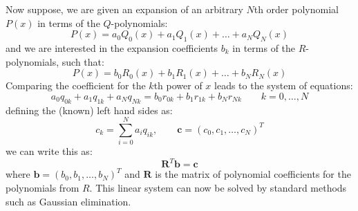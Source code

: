 Now suppose, we are given an expansion of an arbitrary $N$th order polynomial $P(x)$ in terms of the $Q$-polynomials:
\begin{equation}
 P(x) = a_0 Q_0(x) + a_1 Q_1(x) + \ldots + a_N Q_N(x)
\end{equation}
and we are interested in the expansion coefficients $b_k$ in terms of the $R$-polynomials, such that:
\begin{equation}
 P(x) = b_0 R_0(x) + b_1 R_1(x) + \ldots + b_N R_N(x)
\end{equation}
Comparing the coefficient for the $k$th power of $x$ leads to the system of equations:
\begin{equation}
 a_0 q_{0k} + a_1 q_{1k} + a_N q_{Nk} = b_0 r_{0k} + b_1 r_{1k} + b_N r_{Nk} \qquad k = 0, \ldots, N
\end{equation}
defining the (known) left hand sides as:
\begin{equation}
 c_k = \sum_{i=0}^N a_i q_{ik}, \qquad \mathbf{c} = (c_0, c_1, \ldots, c_N)^T
\end{equation}
we can write this as:
\begin{equation}
 \mathbf{R}^T \mathbf{b} = \mathbf{c}
\end{equation}
where $\mathbf{b} = (b_0, b_1, \ldots, b_N)^T$ and $\mathbf{R}$ is the matrix of polynomial coefficients for the polynomials from $R$. This linear system can now be solved by standard methods such as Gaussian elimination.

